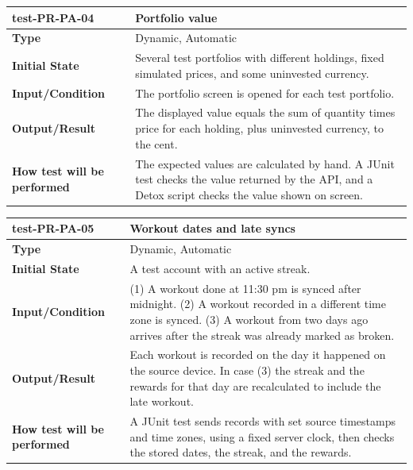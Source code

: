 \documentclass[12pt, titlepage]{article}
\begin{document}
\noindent\begin{tabularx}{\textwidth}{>{\raggedright\arraybackslash}p{3.5cm}X}
  \toprule
  \textbf{test-PR-PA-04} & \textbf{Portfolio value}\\
  \midrule
  \textbf{Type} & Dynamic, Automatic\\
  \textbf{Initial State} & Several test portfolios with different holdings, fixed simulated prices, and some uninvested currency.\\
  \textbf{Input/Condition} & The portfolio screen is opened for each test portfolio.\\
  \textbf{Output/Result} & The displayed value equals the sum of quantity times price for each holding, plus uninvested currency, to the cent.\\
  \textbf{How test will be performed} & The expected values are calculated by hand. A JUnit test checks the value returned by the API, and a Detox script checks the value shown on screen.\\
  \bottomrule
\end{tabularx}

\vspace{1em}

\noindent\begin{tabularx}{\textwidth}{>{\raggedright\arraybackslash}p{3.5cm}X}
  \toprule
  \textbf{test-PR-PA-05} & \textbf{Workout dates and late syncs}\\
  \midrule
  \textbf{Type} & Dynamic, Automatic\\
  \textbf{Initial State} & A test account with an active streak.\\
  \textbf{Input/Condition} & (1) A workout done at 11:30 pm is synced after midnight. (2) A workout recorded in a different time zone is synced. (3) A workout from two days ago arrives after the streak was already marked as broken.\\
  \textbf{Output/Result} & Each workout is recorded on the day it happened on the source device. In case (3) the streak and the rewards for that day are recalculated to include the late workout.\\
  \textbf{How test will be performed} & A JUnit test sends records with set source timestamps and time zones, using a fixed server clock, then checks the stored dates, the streak, and the rewards.\\
  \bottomrule
\end{tabularx}

\vspace{1em}
\end{document}

